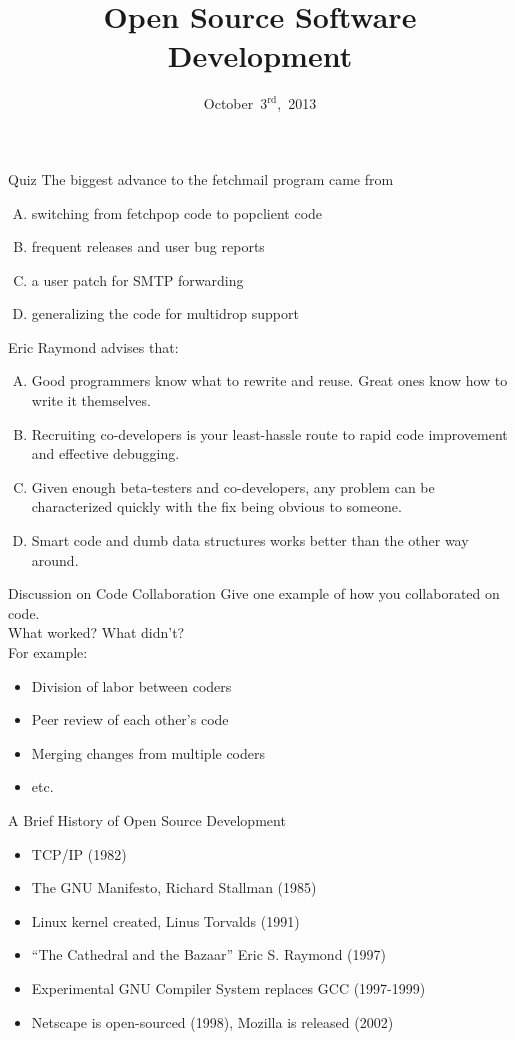 \documentclass{beamer}
\title{Open Source Software Development}
\date{October~$3^{\text{rd}}$,~2013}
\begin{document}
\begin{frame}
\titlepage
\end{frame}

\begin{frame}{Quiz}
The biggest advance to the fetchmail program came from
\begin{enumerate}[(A)]
\item<1> switching from fetchpop code to popclient code
\item<1> frequent releases and user bug reports
\item<1-2> a user patch for SMTP forwarding
\item<1> generalizing the code for multidrop support
\end{enumerate}
\medskip
Eric Raymond advises that:
\begin{enumerate}[(A)]
\item<1> Good programmers know what to rewrite and reuse. Great ones know how to write it themselves.
\item<1> Recruiting co-developers is your least-hassle route to rapid code improvement and effective debugging.
\item<1-2> Given enough beta-testers and co-developers, any problem can be characterized quickly with the fix being obvious to someone.
\item<1>  Smart code and dumb data structures works better than the other way around.
\end{enumerate}
\end{frame}

\begin{frame}{Discussion on Code Collaboration}
Give one example of how you collaborated on code.\\
\bigskip
\bigskip
What worked? What didn't?\\
\bigskip
\bigskip
\pause
For example:
\begin{itemize}
\item Division of labor between coders
\item Peer review of each other's code
\item Merging changes from multiple coders
\item etc.
\end{itemize}
\end{frame}

\begin{frame}{A Brief History of Open Source Development}
\begin{itemize}
\item TCP/IP (1982)
\item The GNU Manifesto, Richard Stallman (1985)
\item Linux kernel created, Linus Torvalds (1991)
\item ``The Cathedral and the Bazaar'' Eric S. Raymond (1997)
\item Experimental GNU Compiler System replaces GCC (1997-1999)
\item Netscape is open-sourced (1998), Mozilla is released (2002)
\end{itemize}
\end{frame}
\end{document}
